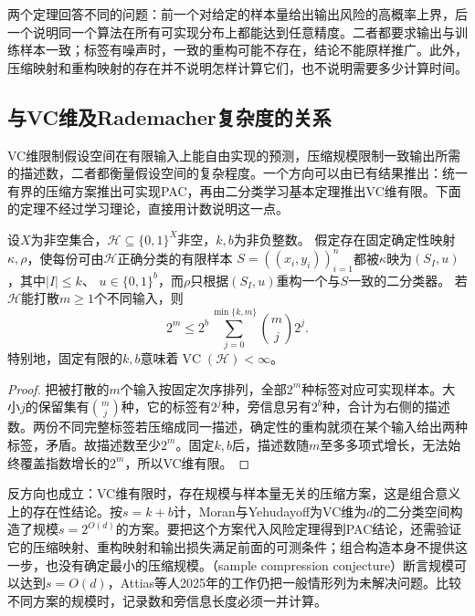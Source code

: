 两个定理回答不同的问题：前一个对给定的样本量给出输出风险的高概率上界，后一个说明同一个算法在所有可实现分布上都能达到任意精度。二者都要求输出与训练样本一致；标签有噪声时，一致的重构可能不存在，结论不能原样推广。此外，压缩映射和重构映射的存在并不说明怎样计算它们，也不说明需要多少计算时间。

\subsection{与VC维及Rademacher复杂度的关系}

VC维限制假设空间在有限输入上能自由实现的预测，压缩规模限制一致输出所需的描述数，二者都衡量假设空间的复杂程度。一个方向可以由已有结果推出：统一有界的压缩方案推出可实现PAC，再由二分类学习基本定理推出VC维有限。下面的定理不经过学习理论，直接用计数说明这一点。

\begin{theorem}[压缩参数对打散的限制]
\label{thm:compression-shattering-count}
设$X$为非空集合，$\mathcal H\subseteq\{0,1\}^X$非空，$k,b$为非负整数。
假定存在固定确定性映射$\kappa,\rho$，使每份可由$\mathcal H$正确分类的有限样本
$S=((x_i,y_i))_{i=1}^n$都被$\kappa$映为$(S_I,u)$，其中$|I|\leq k$、
$u\in\{0,1\}^b$，而$\rho$只根据$(S_I,u)$重构一个与$S$一致的二分类器。
若$\mathcal H$能打散$m\geq1$个不同输入，则
\[
 2^m\leq 2^b\sum_{j=0}^{\min\{k,m\}}\binom mj2^j.
\]
特别地，固定有限的$k,b$意味着$\operatorname{VC}(\mathcal H)<\infty$。
\end{theorem}

\begin{proof}
把被打散的$m$个输入按固定次序排列，全部$2^m$种标签对应可实现样本。大小$j$的保留集有$\binom mj$种，它的标签有$2^j$种，旁信息另有$2^b$种，合计为右侧的描述数。两份不同完整标签若压缩成同一描述，确定性的重构就须在某个输入给出两种标签，矛盾。故描述数至少$2^m$。固定$k,b$后，描述数随$m$至多多项式增长，无法始终覆盖指数增长的$2^m$，所以VC维有限。
\end{proof}

反方向也成立：VC维有限时，存在规模与样本量无关的压缩方案，这是组合意义上的存在性结论。按$s=k+b$计，Moran与Yehudayoff为VC维为$d$的二分类空间构造了规模$s=2^{O(d)}$的方案。要把这个方案代入风险定理得到PAC结论，还需验证它的压缩映射、重构映射和输出损失满足前面的可测条件；组合构造本身不提供这一步，也没有确定最小的压缩规模。（sample compression conjecture）断言规模可以达到$s=O(d)$，Attias等人2025年的工作仍把一般情形列为未解决问题。比较不同方案的规模时，记录数和旁信息长度必须一并计算。

